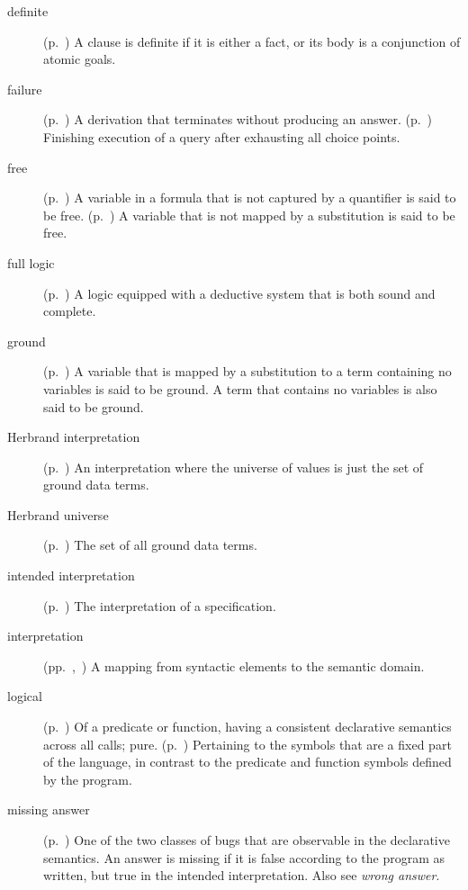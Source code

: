 \begin{description}
\item[definite]
(p.~\pageref{gi:definite})
A clause is definite if it is either a fact,
or its body is a conjunction of atomic goals.

\item[failure]
(p.~\pageref{gi:failure})
A derivation that terminates without producing an answer.
(p.~\pageref{gi:failure})
Finishing execution of a query
after exhausting all choice points.

\item[free]
(p.~\pageref{gi:free})
A variable in a formula that is not captured by a quantifier
is said to be free.
(p.~\pageref{gi:free2})
A variable that is not mapped by a substitution is said to be free.

\item[full logic]
(p.~\pageref{gi:full-logic})
A logic equipped with a deductive system that is both sound and complete.

\item[ground]
(p.~\pageref{gi:ground})
A variable that is mapped by a substitution
to a term containing no variables
is said to be ground.
A term that contains no variables is also said to be ground.

\item[Herbrand interpretation]
(p.~\pageref{gi:herbrand-interpretation})
An interpretation where the universe of values
is just the set of ground data terms.

\item[Herbrand universe]
(p.~\pageref{gi:herbrand-universe})
The set of all ground data terms.

\item[intended interpretation]
(p.~\pageref{gi:intended-interpretation})
The interpretation of a specification.

\item[interpretation]
(pp.~\pageref{gi:interpretation},~\pageref{sec:interpretations})
A mapping from syntactic elements to the semantic domain.

\item[logical]
(p.~\pageref{gi:non-logical})
Of a predicate or function,
having a consistent declarative semantics across all calls; pure.
(p.~\pageref{gi:non-logical2})
Pertaining to the symbols that are a fixed part of the language,
in contrast to the predicate and function symbols defined by the program.

\item[missing answer]
(p.~\pageref{gi:missing-answer})
One of the two classes of bugs
that are observable in the declarative semantics.
An answer is missing if it is false according to the program as written,
but true in the intended interpretation.
Also see \emph{wrong answer}.


\end{description}
